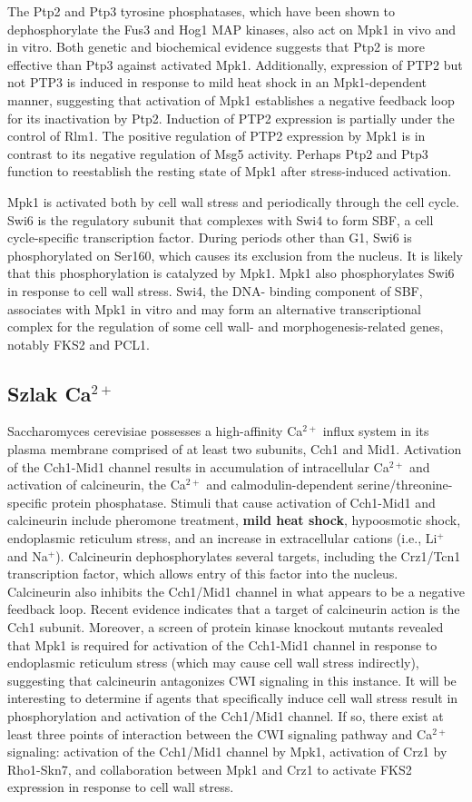 \documentclass{pracamgr}
\begin{document}
The Ptp2 and Ptp3 tyrosine phosphatases, which have been
shown to dephosphorylate the Fus3 and Hog1 MAP kinases,
also act on Mpk1 in vivo and in vitro. Both genetic and
biochemical evidence suggests that Ptp2 is more effective than
Ptp3 against activated Mpk1. Additionally, expression of PTP2
but not PTP3 is induced in response to mild heat shock in an
Mpk1-dependent manner, suggesting that activation of Mpk1
establishes a negative feedback loop for its inactivation by
Ptp2. Induction of PTP2 expression is partially under 
the control of Rlm1. The positive regulation of PTP2 expression
by Mpk1 is in contrast to its negative regulation of Msg5
activity. Perhaps Ptp2 and Ptp3 function to reestablish the
resting state of Mpk1 after stress-induced activation.\cite{CWI}

Mpk1 is activated both by cell wall stress and periodically through the cell cycle.
Swi6 is the regulatory subunit that complexes with Swi4 to form SBF,
a cell cycle-specific transcription factor. During periods other than G1,
Swi6 is phosphorylated on Ser160, which causes its exclusion from the
nucleus. It is likely that this phosphorylation is catalyzed by Mpk1. Mpk1
also phosphorylates Swi6 in response to cell wall stress. Swi4, the DNA-
binding component of SBF, associates with Mpk1 in vitro and may
form an alternative transcriptional complex for the regulation of some
cell wall- and morphogenesis-related genes, notably FKS2 and PCL1.\cite{CWI}


\subsection{Szlak Ca$^{2+}$}
Saccharomyces cerevisiae possesses a
high-affinity Ca$^{2+}$ influx system in its plasma membrane comprised of at least two subunits, Cch1 and Mid1. 
Activation of the Cch1-Mid1 channel
results in accumulation of intracellular Ca$^{2+}$ and activation of
calcineurin, the Ca$^{2+}$ and calmodulin-dependent serine/threonine-specific
protein phosphatase. Stimuli that cause activation of Cch1-Mid1
and calcineurin include pheromone treatment, {\bf mild heat shock}, hypoosmotic shock,
endoplasmic reticulum stress, and an increase in extracellular cations (i.e., Li$^+$ and Na$^+$).
Calcineurin dephosphorylates several targets, including the
Crz1/Tcn1 transcription factor, which allows entry of
this factor into the nucleus. Calcineurin also inhibits the
Cch1/Mid1 channel in what appears to be a negative feedback
loop. Recent evidence indicates that a target of
calcineurin action is the Cch1 subunit. Moreover, a screen
of protein kinase knockout mutants revealed that Mpk1 is
required for activation of the Cch1-Mid1 channel in response
to endoplasmic reticulum stress (which may cause cell wall
stress indirectly), suggesting that calcineurin antagonizes CWI
signaling in this instance. It will be interesting to determine
if agents that specifically induce cell wall stress result in
phosphorylation and activation of the Cch1/Mid1 channel. If
so, there exist at least three points of interaction between the
CWI signaling pathway and Ca$^{2+}$ signaling: activation of the
Cch1/Mid1 channel by Mpk1, activation of Crz1 by Rho1-Skn7,
and collaboration between Mpk1 and Crz1 to activate
FKS2 expression in response to cell wall stress.\cite{CWI}
\end{document}
